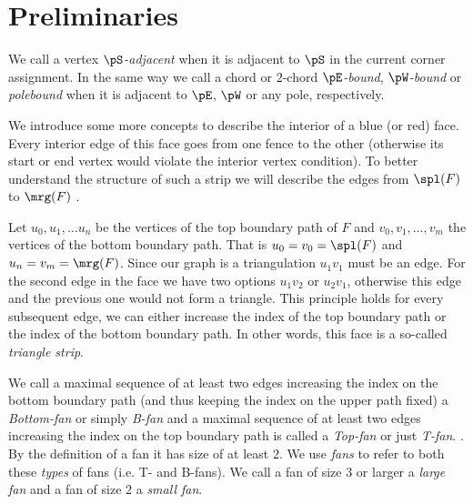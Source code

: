 
\section{Preliminaries}
\thispagestyle{plain}

  We call a vertex \emph{$\pS$-adjacent} when it is adjacent to $\pS$ in the current corner assignment. In the same way we call a chord or $2$-chord \emph{$\pE$-bound}, \emph{$\pW$-bound} or \emph{polebound} when it is adjacent to $\pE$, $\pW$ or any pole,  respectively.

  We introduce some more concepts to describe the interior of a blue (or red) face. Every interior edge of this face goes from one fence to the other (otherwise its start or end vertex would violate the interior vertex condition). To better understand the structure of such a strip we will describe the edges from $\spl(F)$ to $\mrg(F)$ .

  Let $u_0 , u_1, \ldots u_n$ be the vertices of the top boundary path of $F$ and $v_0, v_1, \ldots, v_m$ the vertices of the bottom boundary path. That is $u_0=v_0 = \spl(F)$ and $u_n = v_m = \mrg(F)$. Since our graph is a triangulation $u_1v_1$ must be an edge. For the second edge in the face we have two options $u_1v_2$ or $u_2v_1$, otherwise this edge and the previous one would not form a triangle. This principle holds for every subsequent edge, we can either increase the index of the top boundary path or the index of the bottom boundary path. In other words, this face is a so-called \emph{triangle strip}.

  We call a maximal sequence of at least two edges increasing the index on the bottom boundary path (and thus keeping the index on the upper path fixed) a \emph{Bottom-fan} or simply \emph{B-fan} and a maximal sequence of at least two edges increasing the index on the top boundary path is called a \emph{Top-fan} or just \emph{T-fan}. . By the definition of a fan it has size of at least $2$.
  We use \emph{fans} to refer to both these \emph{types} of fans (i.e. T- and B-fans).
  We call a fan of size $3$ or larger a \emph{large fan} and a fan of size $2$ a \emph{small fan}.

